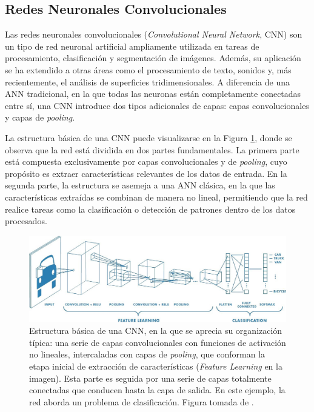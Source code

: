 \subsection{Redes Neuronales Convolucionales}
\label{section2:cnn}
Las redes neuronales convolucionales (\textit{Convolutional Neural Network}, CNN) \cite{lecun_backpropagation_1989, leCUM_CNN} son un tipo de red neuronal artificial ampliamente utilizada en tareas de procesamiento, clasificación y segmentación de imágenes. Además, su aplicación se ha extendido a otras áreas como el procesamiento de texto, sonidos y, más recientemente, el análisis de superficies tridimensionales. A diferencia de una ANN tradicional, en la que todas las neuronas están completamente conectadas entre sí, una CNN introduce dos tipos adicionales de capas: capas convolucionales y capas de \textit{pooling}.

La estructura básica de una CNN puede visualizarse en la Figura \ref{fig:cnnExample}, donde se observa que la red está dividida en dos partes fundamentales. La primera parte está compuesta exclusivamente por capas convolucionales y de \textit{pooling}, cuyo propósito es extraer características relevantes de los datos de entrada. En la segunda parte, la estructura se asemeja a una ANN clásica, en la que las características extraídas se combinan de manera no lineal, permitiendo que la red realice tareas como la clasificación o detección de patrones dentro de los datos procesados.

\begin{figure}[h]
    \centering
    \includegraphics[width=\linewidth]{figures/2_theory/cnnExample.jpeg}
    \caption[Estructura básica de una CNN]{Estructura básica de una CNN, en la que se aprecia su organización típica: una serie de capas convolucionales con funciones de activación no lineales, intercaladas con capas de \textit{pooling}, que conforman la etapa inicial de extracción de características (\textit{Feature Learning} en la imagen). Esta parte es seguida por una serie de capas totalmente conectadas que conducen hasta la capa de salida. En este ejemplo, la red aborda un problema de clasificación. Figura tomada de \cite{prabhu_understanding_2019}.}
    \label{fig:cnnExample}
\end{figure}

